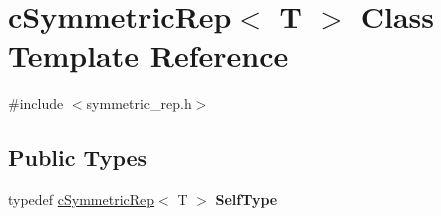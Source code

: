 \hypertarget{classcSymmetricRep}{\section{c\-Symmetric\-Rep$<$ \-T $>$ \-Class \-Template \-Reference}
\label{classcSymmetricRep}
}


{\ttfamily \#include $<$symmetric\-\_\-rep.\-h$>$}

\subsection*{\-Public \-Types}
\begin{DoxyCompactItemize}
\item 
\hypertarget{classcSymmetricRep_abb21d3323b4e2133ec7bbc4f2d45d968}{typedef \hyperlink{classcSymmetricRep}{c\-Symmetric\-Rep}$<$ \-T $>$ {\bfseries \-Self\-Type}}\label{classcSymmetricRep_abb21d3323b4e2133ec7bbc4f2d45d968}

\end{DoxyCompactItemize}
